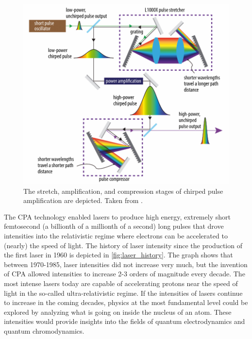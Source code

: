 \begin{figure}
	\centering
	\includegraphics[width=0.9\linewidth]{planning/images/cpa.PNG}
	\caption{The stretch, amplification, and compression stages of chirped pulse amplification are depicted. Taken from \cite{Arrigoni_2019_Photonics}.}
	\label{fig:cpa}
\end{figure}
The \gls{CPA} technology enabled lasers to produce high energy, extremely short femtosecond (a billionth of a millionth of a second) long pulses that drove intensities into the relativistic regime where electrons can be accelerated to (nearly) the speed of light. The history of laser intensity since the production of the first laser in 1960 is depicted in \autoref{fig:laser_history}. The graph shows that between 1970-1985, laser intensities did not increase very much, but the invention of \gls{CPA} allowed intensities to increase 2-3 orders of magnitude every decade. The most intense lasers today are capable of accelerating protons near the speed of light in the so-called ultra-relativistic regime. If the intensities of lasers continue to increase in the coming decades, physics at the most fundamental level could be explored by analyzing what is going on inside the nucleus of an atom. These intensities would provide insights into the fields of quantum electrodynamics and quantum chromodynamics. 

